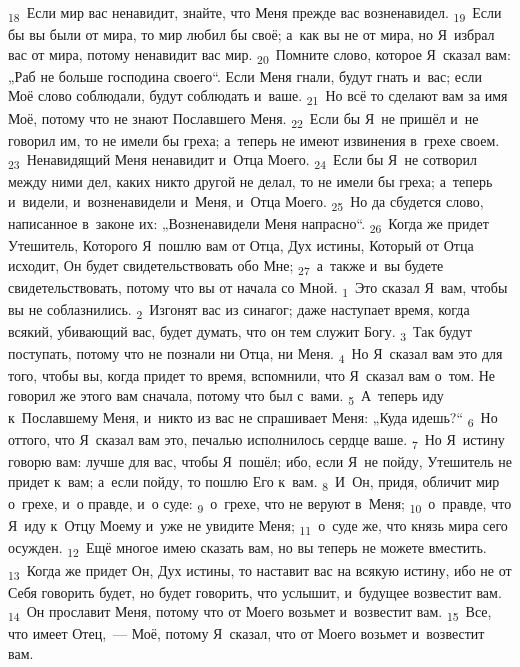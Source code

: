 \documentclass[a4paper,12pt]{article}
\begin{document}
\textsubscript{18}~Если мир вас ненавидит, знайте, что Меня прежде вас возненавидел.
\textsubscript{19}~Если бы вы были от мира, то мир любил бы своё; а~как вы не от мира, но Я~избрал вас от мира, потому ненавидит вас мир.
\textsubscript{20}~Помните слово, которое Я~сказал вам: „Раб не больше господина своего“. Если Меня гнали, будут гнать и~вас; если Моё слово соблюдали, будут соблюдать и~ваше.
\textsubscript{21}~Но всё то сделают вам за имя Моё, потому что не знают Пославшего Меня.
\textsubscript{22}~Если бы Я~не пришёл и~не говорил им, то не имели бы греха; а~теперь не имеют извинения в~грехе своем.
\textsubscript{23}~Ненавидящий Меня ненавидит и~Отца Моего.
\textsubscript{24}~Если бы Я~не сотворил между ними дел, каких никто другой не делал, то не имели бы греха; а~теперь и~видели, и~возненавидели и~Меня, и~Отца Моего.
\textsubscript{25}~Но да сбудется слово, написанное в~законе их: „Возненавидели Меня напрасно“.
\textsubscript{26}~Когда же придет Утешитель, Которого Я~пошлю вам от Отца, Дух истины, Который от Отца исходит, Он будет свидетельствовать обо Мне;
\textsubscript{27}~а~также и~вы будете свидетельствовать, потому что вы от начала со Мной.
\textsubscript{1}~Это сказал Я~вам, чтобы вы не соблазнились.
\textsubscript{2}~Изгонят вас из синагог; даже наступает время, когда всякий, убивающий вас, будет думать, что он тем служит Богу.
\textsubscript{3}~Так будут поступать, потому что не познали ни Отца, ни Меня.
\textsubscript{4}~Но Я~сказал вам это для того, чтобы вы, когда придет то время, вспомнили, что Я~сказал вам о~том. Не говорил же этого вам сначала, потому что был с~вами.
\textsubscript{5}~А~теперь иду к~Пославшему Меня, и~никто из вас не спрашивает Меня: „Куда идешь?“
\textsubscript{6}~Но оттого, что Я~сказал вам это, печалью исполнилось сердце ваше.
\textsubscript{7}~Но Я~истину говорю вам: лучше для вас, чтобы Я~пошёл; ибо, если Я~не пойду, Утешитель не придет к~вам; а~если пойду, то пошлю Его к~вам.
\textsubscript{8}~И~Он, придя, обличит мир о~грехе, и~о правде, и~о суде:
\textsubscript{9}~о~грехе, что не веруют в~Меня;
\textsubscript{10}~о~правде, что Я~иду к~Отцу Моему и~уже не увидите Меня;
\textsubscript{11}~о~суде же, что князь мира сего осужден.
\textsubscript{12}~Ещё многое имею сказать вам, но вы теперь не можете вместить.
\textsubscript{13}~Когда же придет Он, Дух истины, то наставит вас на всякую истину, ибо не от Себя говорить будет, но будет говорить, что услышит, и~будущее возвестит вам.
\textsubscript{14}~Он прославит Меня, потому что от Моего возьмет и~возвестит вам.
\textsubscript{15}~Все, что имеет Отец,~--- Моё, потому Я~сказал, что от Моего возьмет и~возвестит вам.
\end{document}
